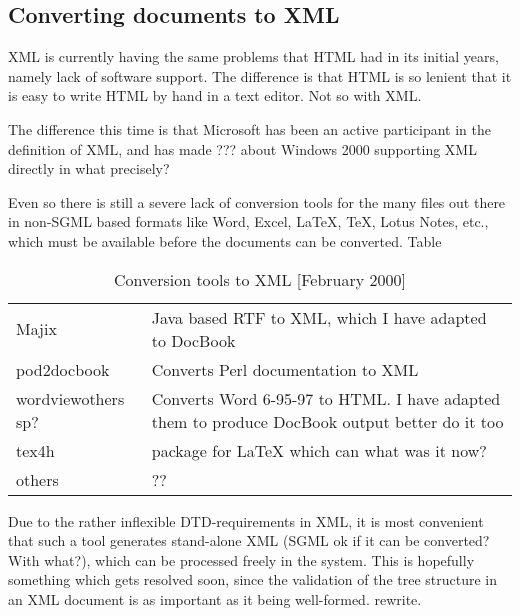\subsection{Converting documents to XML}

XML is currently having the same problems that HTML had in its initial
years, namely lack of software support.  The difference is that HTML
is so lenient that it is easy to write HTML by hand in a text editor.
Not so with XML.

The difference this time is that Microsoft has been an active
participant in the \textsf{definition of XML}, and has made
\textsf{???} about Windows 2000 supporting XML directly \textsf{in
  what precisely?}

Even so there is still a severe lack of conversion tools for the many
files out there in non-SGML based formats like Word, Excel, {\LaTeX},
{\TeX}, Lotus Notes, etc., which must be available before the
documents can be converted.  Table~

\begin{table}[htbp]
  \begin{center}
    \begin{tabular}{|l|p{10cm}|}
      \hline\hline
      Majix & Java based RTF to XML, which I have adapted to DocBook
      \\
      pod2docbook & Converts Perl documentation to XML
      \\
      wordview\textsf{others} \textsf{sp?} & Converts \textsf{Word 6-95-97} to
      HTML.  I have adapted them to produce DocBook output
      \textsf{better do it too}
      \\
      tex4h & package for {\LaTeX} which can \textsf{what was it now?}
      \\
      \textsf{others} & ??
      \\
      \hline
    \end{tabular}
    \caption{Conversion tools to XML [February 2000]}
    \label{tab:conversion-tools-to-xml}
  \end{center}
\end{table}

Due to the rather inflexible DTD-requirements in XML, it is most
convenient that such a tool generates stand-alone XML (\textsf{SGML ok
  if it can be converted?  With what?}), which can be processed freely
in the system.  This is hopefully something which gets resolved soon,
since the validation of the tree structure in an XML document is as
important as it being well-formed. \textsf{rewrite.}

